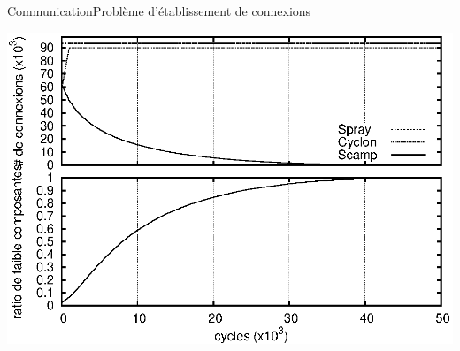 \begin{frame}{Communication}{Problème d'établissement de connexions}

  \begin{center}
    \includegraphics[width=1\textwidth]{img/network/degen.eps}
  \end{center}

\end{frame}

